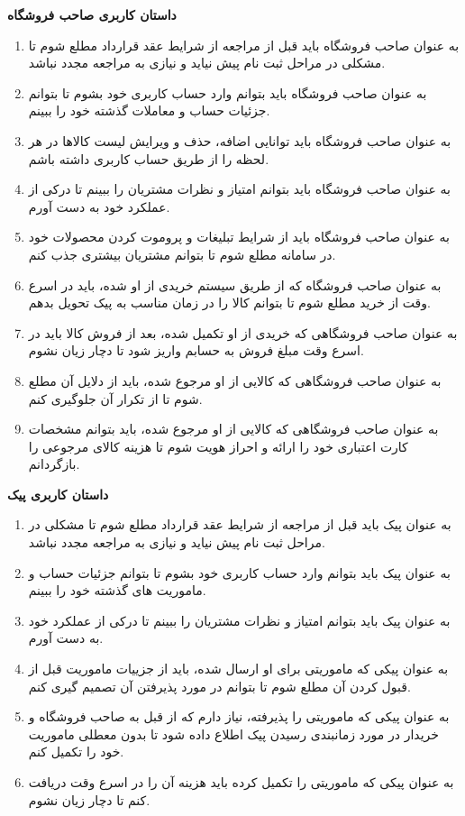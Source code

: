 \documentclass[12pt,a4paper]{article}
\begin{document}
\textbf{داستان کاربری صاحب فروشگاه}

\begin{enumerate}
	
\item
به عنوان صاحب فروشگاه باید قبل از مراجعه از شرایط عقد قرارداد مطلع شوم تا مشکلی در مراحل ثبت نام پیش نیاید و نیازی به مراجعه مجدد نباشد.
	\item
	به عنوان صاحب فروشگاه باید بتوانم وارد حساب کاربری خود بشوم تا بتوانم جزئیات حساب و معاملات گذشته خود را ببینم.
	\item
	به عنوان صاحب فروشگاه باید توانایی اضافه، حذف و ویرایش لیست کالاها در هر لحظه را از طریق حساب کاربری داشته باشم.
	\item
	به عنوان صاحب فروشگاه باید بتوانم امتیاز و نظرات مشتریان را ببینم تا درکی از عملکرد خود به دست آورم.
	\item
	به عنوان صاحب فروشگاه باید از شرایط تبلیغات و پروموت کردن محصولات خود در سامانه مطلع شوم تا بتوانم مشتریان بیشتری جذب کنم.
	\item
	به عنوان صاحب فروشگاه که از طریق سیستم خریدی از او شده، باید در اسرع وقت از خرید مطلع شوم تا بتوانم کالا را در زمان مناسب به پیک تحویل بدهم.
	\item
	به عنوان صاحب فروشگاهی که خریدی از او تکمیل شده، بعد از فروش کالا باید در اسرع وقت مبلغ فروش به حسابم واریز شود تا دچار زیان نشوم.
	\item
	به عنوان صاحب فروشگاهی که کالایی از او مرجوع شده، باید از دلایل آن مطلع شوم تا از تکرار آن جلوگیری کنم.
	\item
	به عنوان صاحب فروشگاهی که کالایی از او مرجوع شده، باید بتوانم مشخصات کارت اعتباری خود را ارائه و احراز هویت شوم تا هزینه کالای مرجوعی را بازگردانم.
\end{enumerate}

\textbf{داستان کاربری پیک}

\begin{enumerate}
	\item 
به عنوان پیک باید قبل از مراجعه از شرایط عقد قرارداد مطلع شوم تا مشکلی در مراحل ثبت نام پیش نیاید و نیازی به مراجعه مجدد نباشد.
\item
به عنوان پیک باید بتوانم وارد حساب کاربری خود بشوم تا بتوانم جزئیات حساب و ماموریت های گذشته خود را ببینم.
\item
به عنوان پیک باید بتوانم امتیاز و نظرات مشتریان را ببینم تا درکی از عملکرد خود به دست آورم.
\item
به عنوان پیکی که ماموریتی برای او ارسال شده، باید از جزییات ماموریت قبل از قبول کردن آن مطلع شوم تا بتوانم در مورد پذیرفتن آن تصمیم گیری کنم.
\item
به عنوان پیکی که ماموریتی را پذیرفته، نیاز دارم که از قبل به صاحب فروشگاه و خریدار در مورد زمانبندی رسیدن پیک اطلاع داده شود تا بدون معطلی ماموریت خود را تکمیل کنم.
\item
به عنوان پیکی که ماموریتی را تکمیل کرده باید هزینه آن را در اسرع وقت دریافت کنم تا دچار زیان نشوم.
\end{enumerate}
\pagebreak
{\large\textbf{}}	
\end{document}

